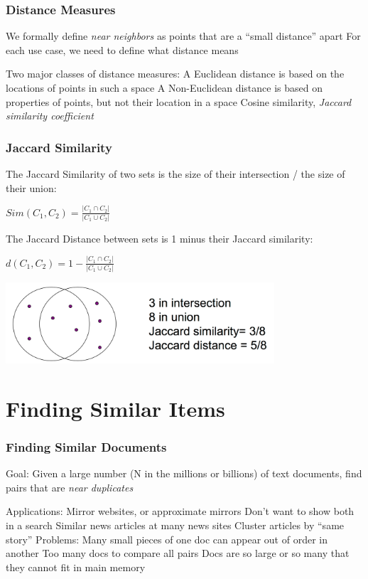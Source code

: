 \documentclass[svgnames]{beamer}
\begin{document}
  
\begin{frame} \frametitle{Distance Measures}

We formally define \emph{near neighbors} as points that are a “small distance” apart
For each use case, we need to define what distance means

Two major classes of distance measures:
  A Euclidean distance is based on the locations of points in such a space
  A Non-Euclidean distance is based on properties of points, but not their location in a space
     Cosine similarity, \emph{Jaccard similarity coefficient}
  
\end{frame}

  
\begin{frame} \frametitle{Jaccard Similarity}

The Jaccard Similarity of two sets is the size of their intersection / the size of their union:

$Sim(C_1, C_2) = \frac{|C_1 \cap C_2|}{|C_1 \cup C_2|}$

The Jaccard Distance between sets is 1 minus their Jaccard similarity:

$d(C_1, C_2) = 1 - \frac{|C_1 \cap C_2|}{|C_1 \cup C_2|}$


\includegraphics[width=10cm]{jaccard}

\end{frame}

  
\section{Finding Similar Items}

  
\begin{frame} \frametitle{Finding Similar Documents}

Goal: Given a large number (N in the millions or billions) of text documents, find pairs that are \emph{near duplicates}

Applications:
  Mirror websites, or approximate mirrors
    Don’t want to show both in a search
  Similar news articles at many news sites
    Cluster articles by “same story”
Problems:
  Many small pieces of one doc can appear out of order in another
  Too many docs to compare all pairs
  Docs are so large or so many that they cannot fit in main memory

\end{frame}
\end{document}
